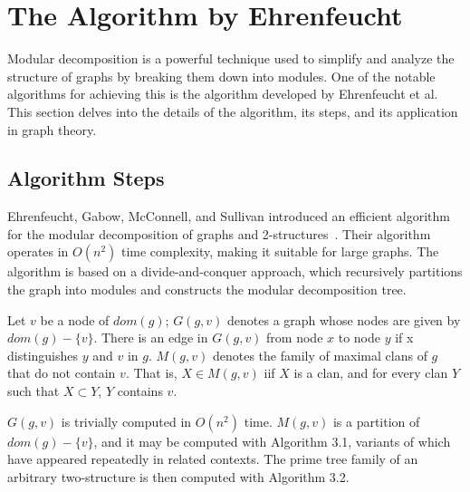 
\chapter{The Algorithm by Ehrenfeucht}\label{ch:the-algorithm-by-ehrenfeucht}

Modular decomposition is a powerful technique used to simplify and analyze the structure of graphs by breaking them down into modules.
One of the notable algorithms for achieving this is the algorithm developed by Ehrenfeucht et al.
This section delves into the details of the algorithm, its steps, and its application in graph theory.

\section{Algorithm Steps}\label{sec:algorithm-steps}


Ehrenfeucht, Gabow, McConnell, and Sullivan introduced an efficient algorithm for the modular decomposition of graphs and 2-structures~\cite{PTDMD}.
Their algorithm operates in $O(n^2)$ time complexity, making it suitable for large graphs.
The algorithm is based on a divide-and-conquer approach, which recursively partitions the graph into modules and constructs the modular decomposition tree.

\begin{mydef}
    Let $v$ be a node of $dom(g)$; $G(g, v)$ denotes a graph whose nodes are given by $dom(g) - \{v\}$.
    There is an edge in $G(g, v)$ from node $x$ to node $y$ if x distinguishes $y$ and $v$ in $g$.
    $M(g, v)$ denotes the family of maximal clans of $g$ that do not contain $v$.
    That is, $X \in M(g, v)$ iif $X$ is a clan, and for every clan $Y$ such that $X \subset Y$, $Y$ contains $v$.
\end{mydef}

$G(g, v)$ is trivially computed in $O(n^2)$ time.
$M(g, v)$ is a partition of $dom(g) - \{v\}$, and it may be computed with Algorithm 3.1, variants of which have appeared repeatedly in related contexts.
The prime tree family of an arbitrary two-structure is then computed with Algorithm 3.2.

